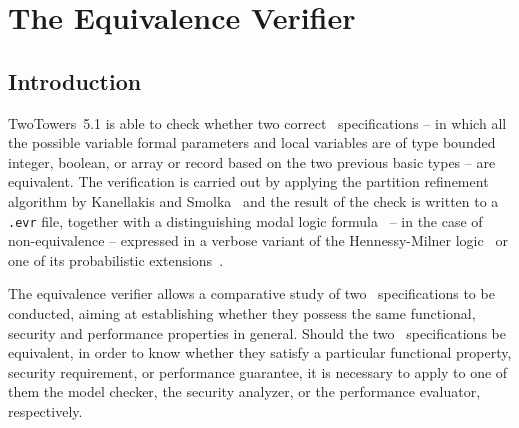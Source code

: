 \chapter{The Equivalence Verifier}


\section{Introduction}

TwoTowers~5.1 is able to check whether two correct \aemilia\ specifications -- in which all the possible
variable formal parameters and local variables are of type bounded integer, boolean, or array or record
based on the two previous basic types -- are equivalent. The verification is carried out by applying the
partition refinement algorithm by Kanellakis and Smolka~\cite{KS} and the result of the check is written to
a {\tt .evr} file, together with a distinguishing modal logic formula~\cite{Cle} -- in the case of
non-equivalence -- expressed in a verbose variant of the Hennessy-Milner logic~\cite{HM} or one of its
probabilistic extensions~\cite{LS,CGH}.

The equivalence verifier allows a comparative study of two \aemilia\ specifications to be conducted, aiming
at establishing whether they possess the same functional, security and performance properties in general.
Should the two \aemilia\ specifications be equivalent, in order to know whether they satisfy a particular
functional property, security requirement, or performance guarantee, it is necessary to apply to one of them
the model checker, the security analyzer, or the performance evaluator, respectively.



